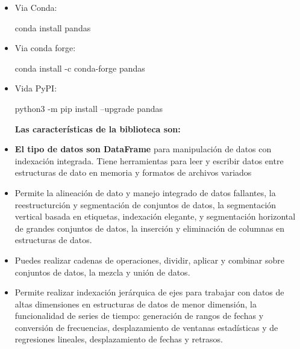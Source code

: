 \documentclass[11pt]{article}
\newenvironment{Shaded}{}{}
\newcommand{\NormalTok}[1]{{#1}}
\newcommand{\ExtensionTok}[1]{{#1}}
\begin{document}
\begin{itemize}
\item
  Via Conda:

\begin{Shaded}
\begin{Highlighting}[]
\ExtensionTok{conda}\NormalTok{ install pandas}
\end{Highlighting}
\end{Shaded}
\item
  Via conda forge:

\begin{Shaded}
\begin{Highlighting}[]
\ExtensionTok{conda}\NormalTok{ install -c conda-forge pandas}
\end{Highlighting}
\end{Shaded}
\item
  Vida PyPI:

\begin{Shaded}
\begin{Highlighting}[]
\ExtensionTok{python3}\NormalTok{ -m pip install --upgrade pandas}
\end{Highlighting}
\end{Shaded}

  \textbf{Las características de la biblioteca son:}
\item
  \textbf{El tipo de datos son DataFrame} para manipulación de datos con
  indexación integrada. Tiene herramientas para leer y escribir datos
  entre estructuras de dato en memoria y formatos de archivos variados\\
\item
  Permite la alineación de dato y manejo integrado de datos fallantes,
  la reestructurción y segmentación de conjuntos de datos, la
  segmentación vertical basada en etiquetas, indexación elegante, y
  segmentación horizontal de grandes conjuntos de datos, la inserción y
  eliminación de columnas en estructuras de datos.\\
\item
  Puedes realizar cadenas de operaciones, dividir, aplicar y combinar
  sobre conjuntos de datos, la mezcla y unión de datos.
\item
  Permite realizar indexación jerárquica de ejes para trabajar con datos
  de altas dimensiones en estructuras de datos de menor dimensión, la
  funcionalidad de series de tiempo: generación de rangos de fechas y
  conversión de frecuencias, desplazamiento de ventanas estadísticas y
  de regresiones lineales, desplazamiento de fechas y retrasos.
\end{itemize}
\end{document}
